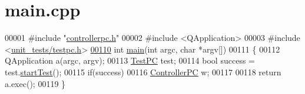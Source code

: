 \hypertarget{main_8cpp_source}{}\section{main.\+cpp}
\label{main_8cpp_source}

\begin{DoxyCode}
00001 \textcolor{preprocessor}{#include "\mbox{\hyperlink{controllerpc_8h}{controllerpc.h}}"}
00002 \textcolor{preprocessor}{#include <QApplication>}
00003 \textcolor{preprocessor}{#include <\mbox{\hyperlink{testpc_8h}{unit\_tests/testpc.h}}>}
\mbox{\hyperlink{main_8cpp_a0ddf1224851353fc92bfbff6f499fa97}{00110}} \textcolor{keywordtype}{int} \mbox{\hyperlink{main_8cpp_a0ddf1224851353fc92bfbff6f499fa97}{main}}(\textcolor{keywordtype}{int} argc, \textcolor{keywordtype}{char} *argv[])
00111 \{
00112     QApplication a(argc, argv);
00113     \mbox{\hyperlink{class_test_p_c}{TestPC}} test;
00114     \textcolor{keywordtype}{bool} success = test.\mbox{\hyperlink{class_test_p_c_ad0d724439a65d183d3d336b667cb867b}{startTest}}();
00115     \textcolor{keywordflow}{if}(success)
00116         \mbox{\hyperlink{class_controller_p_c}{ControllerPC}} w;
00117 
00118     \textcolor{keywordflow}{return} a.exec();
00119 \}
\end{DoxyCode}
